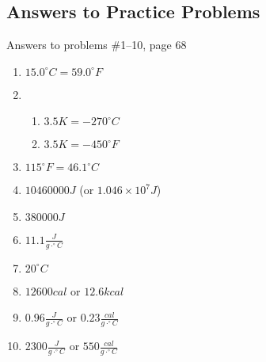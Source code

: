 \documentclass[11pt, oneside]{article}   	%
\begin{document}
\pagebreak
\subsection{Answers to Practice Problems}
Answers to problems \#1--10, page 68

\begin{enumerate}
\item $15.0^{\circ}C = 59.0^{\circ}F$
\item 
\begin{enumerate}
\item $3.5 K = -270^{\circ}C$
\item $3.5 K = -450 ^{\circ}F$
\end{enumerate}
\item $115^{\circ}F = 46.1^{\circ}C$
\item $10460000 J$ (or $1.046 \times 10^{7} J$)
\item $380000 J$
\item $11.1 \frac{J}{g \cdot ^{\circ}C}$
\item $20^{\circ}C$
\item $12600 cal $ or $12.6 kcal$
\item $0.96 \frac{J}{g \cdot ^{\circ}C}$ or $ 0.23 \frac{cal}{g \cdot ^{\circ}C}$
\item $2300 \frac{J}{g \cdot ^{\circ}C}$ or $550 \frac{cal}{g \cdot ^{\circ}C}$
\end{enumerate}


\nocite{wile-chem-2}
{}

\end{document}
